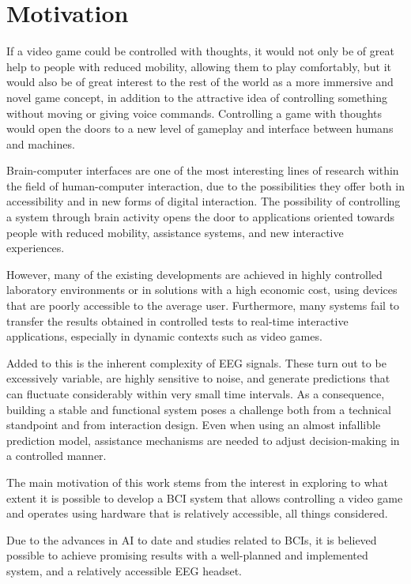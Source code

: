 \section*{Motivation}

If a video game could be controlled with thoughts, it would not only be of
great help to people with reduced mobility, allowing them to play comfortably,
but it would also be of great interest to the rest of the world as a more
immersive and novel game concept, in addition to the attractive idea of
controlling something without moving or giving voice commands. Controlling a
game with thoughts would open the doors to a new level of gameplay and interface
between humans and machines.

Brain-computer interfaces are one of the most interesting lines of research
within the field of human-computer interaction, due to the possibilities they
offer both in accessibility and in new forms of digital interaction. The
possibility of controlling a system through brain activity opens the door to
applications oriented towards people with reduced mobility, assistance systems,
and new interactive experiences.

However, many of the existing developments are achieved in highly controlled
laboratory environments or in solutions with a high economic cost, using devices
that are poorly accessible to the average user. Furthermore, many systems fail
to transfer the results obtained in controlled tests to real-time interactive
applications, especially in dynamic contexts such as video games.

Added to this is the inherent complexity of EEG signals. These turn out to be
excessively variable, are highly sensitive to noise, and generate predictions
that can fluctuate considerably within very small time intervals. As a
consequence, building a stable and functional system poses a challenge both
from a technical standpoint and from interaction design. Even when using an
almost infallible prediction model, assistance mechanisms are needed to adjust
decision-making in a controlled manner.

The main motivation of this work stems from the interest in exploring to what
extent it is possible to develop a BCI system that allows controlling a video
game and operates using hardware that is relatively accessible, all things
considered.

Due to the advances in AI to date and studies related to BCIs, it is believed
possible to achieve promising results with a well-planned and implemented
system, and a relatively accessible EEG headset.

